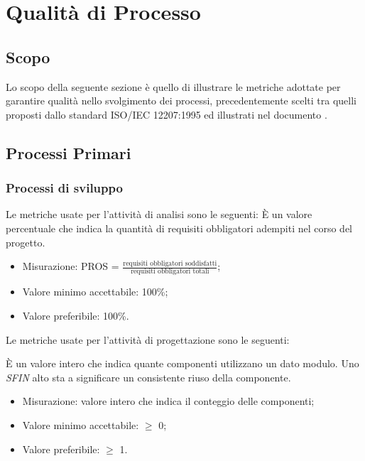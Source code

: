\section{Qualità di Processo}

\subsection{Scopo}
Lo scopo della seguente sezione è quello di illustrare le metriche adottate per garantire qualità nello svolgimento dei processi, precedentemente scelti tra quelli proposti dallo standard ISO/IEC 12207:1995 ed illustrati nel documento \textit{\NdP}.

\subsection{Processi Primari}

	\subsubsection{Processi di sviluppo}
	
		Le metriche usate per l'attività di analisi sono le seguenti:
			È un valore percentuale che indica la quantità di requisiti obbligatori adempiti nel corso del progetto.
			 \begin{itemize}
			\item{Misurazione: PROS = $\displaystyle\frac{\mbox{requisiti obbligatori soddisfatti}}{\mbox{requisiti obbligatori totali}}$;}
			\item{Valore minimo accettabile: 100\%;}
			\item{Valore preferibile: 100\%.}
		\end{itemize}

		Le metriche usate per l'attività di progettazione sono le seguenti:
		
			È un valore intero che indica quante componenti utilizzano un dato modulo. Uno \textit{SFIN} alto sta a significare un consistente riuso della componente.
		\begin{itemize}
			\item{Misurazione: valore intero che indica il conteggio delle componenti;}
			\item{Valore minimo accettabile: $\geq$ 0;}
			\item{Valore preferibile: $\geq$ 1.}
		\end{itemize}
	
